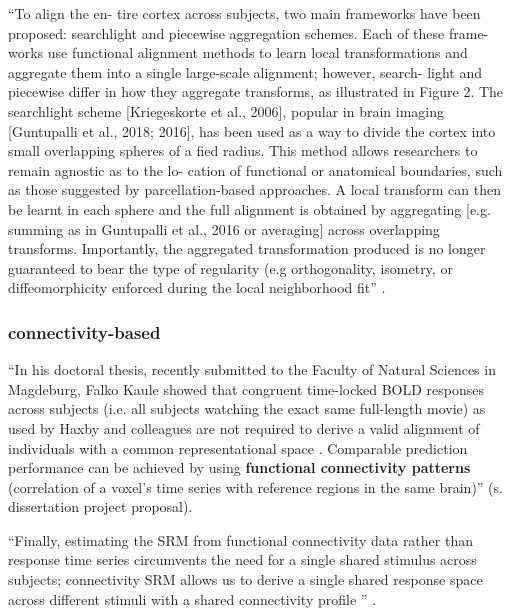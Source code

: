 ``To align the en- tire cortex across subjects, two main frameworks have been
proposed: searchlight and piecewise aggregation schemes. Each of these frame-
works use functional alignment methods to learn local transformations and
aggregate them into a single large-scale alignment; however, search- light and
piecewise differ in how they aggregate transforms, as illustrated in Figure 2.
The searchlight scheme [Kriegeskorte et al., 2006], popular in brain imaging
[Guntupalli et al., 2018; 2016], has been used as a way to divide the cortex
into small overlapping spheres of a fied radius. This method allows researchers
to remain agnostic as to the lo- cation of functional or anatomical boundaries,
such as those suggested by parcellation-based approaches. A local transform can
then be learnt in each sphere and the full alignment is obtained by aggregating
[e.g. summing as in Guntupalli et al., 2016 or averaging] across overlapping
transforms. Importantly, the aggregated transformation produced is no longer
guaranteed to bear the type of regularity (e.g orthogonality, isometry, or
diffeomorphicity enforced during the local neighborhood fit''
\citep{bazeille2021empirical}.


\subsubsection{connectivity-based}



``In his doctoral thesis, recently submitted to the Faculty of Natural Sciences
in Magdeburg, Falko Kaule showed that congruent time-locked BOLD responses
across subjects (i.e. all subjects watching the exact same full-length movie) as
used by Haxby and colleagues are not required to derive a valid alignment of
individuals with a common representational space \citep{kaule2017examination}.
%
Comparable prediction performance can be achieved by using \textbf{functional
connectivity patterns} (correlation of a voxel's time series with reference
regions in the same brain)'' (s. dissertation project proposal).


``Finally, estimating the SRM from functional connectivity
data rather than response time series circumvents the need for a single shared
stimulus across subjects; connectivity SRM allows us to derive a single shared
response space across different stimuli with a shared connectivity profile
\citep{nastase2019leveraging}'' \citep{kumar2020brainiak}.



